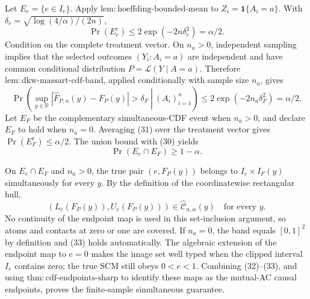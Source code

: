 Let \(E_e=\{e\in I_e\}\).  Apply \(\mathrm{lem:hoeffding\text{-}bounded\text{-}mean}\) to \(Z_i=\mathbf 1\{A_i=a\}\).  With \(\delta_e=\sqrt{\log(4/\alpha)/(2n)}\),
\[
 \Pr(E_e^c)\le2\exp(-2n\delta_e^2)=\alpha/2. \tag{30}
\]
Condition on the complete treatment vector.  On \(n_a>0\), independent sampling implies that the selected outcomes \((Y_i:A_i=a)\) are independent and have common conditional distribution \(P=\mathcal L(Y\mid A=a)\).  Therefore \(\mathrm{lem:dkw\text{-}massart\text{-}cdf\text{-}band}\), applied conditionally with sample size \(n_a\), gives
\[
 \Pr\left(\left.\sup_{y\in\mathbb R}
 |\widehat F_{P,n}(y)-F_P(y)|>\delta_F\ \right|\ (A_i)_{i=1}^n\right)
 \le2\exp(-2n_a\delta_F^2)=\alpha/2. \tag{31}
\]
Let \(E_F\) be the complementary simultaneous-CDF event when \(n_a>0\), and declare \(E_F\) to hold when \(n_a=0\).  Averaging (31) over the treatment vector gives \(\Pr(E_F^c)\le\alpha/2\).  The union bound with (30) yields
\[
 \Pr(E_e\cap E_F)\ge1-\alpha. \tag{32}
\]

On \(E_e\cap E_F\) and \(n_a>0\), the true pair \((e,F_P(y))\) belongs to \(I_e\times I_F(y)\) simultaneously for every \(y\).  By the definition of the coordinatewise rectangular hull,
\[
 (L_e(F_P(y)),U_e(F_P(y)))
 \in\widehat{\mathcal C}_{n,\alpha}(y)
 \quad\text{for every }y. \tag{33}
\]
No continuity of the endpoint map is used in this set-inclusion argument, so atoms and contacts at zero or one are covered.  If \(n_a=0\), the band equals \([0,1]^2\) by definition and (33) holds automatically.  The algebraic extension of the endpoint map to \(e=0\) makes the image set well typed when the clipped interval \(I_e\) contains zero; the true SCM still obeys \(0<e<1\).  Combining (32)--(33), and using \(\mathrm{thm:cdf\text{-}endpoints\text{-}sharp}\) to identify these maps as the mutual-AC causal endpoints, proves the finite-sample simultaneous guarantee.